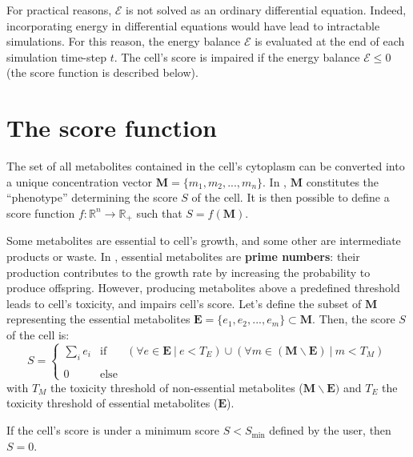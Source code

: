 For practical reasons, $\mathcal{E}$ is not solved as an ordinary differential equation. Indeed, incorporating energy in differential equations would have lead to intractable simulations. For this reason, the energy balance $\mathcal{E}$ is evaluated at the end of each simulation time-step $t$. The cell's score is impaired if the energy balance $\mathcal{E} \leq 0$ (the score function is described below).


\section{The score function}
\label{sec:part2:methodology:score_function}

The set of all metabolites contained in the cell's cytoplasm can be converted into a unique concentration vector $\boldsymbol{M} = \{m_1, m_2, ..., m_n\}$. In {\EvoEvoSim}, $\boldsymbol{M}$ constitutes the ``phenotype'' determining the score $S$ of the cell. It is then possible to define a score function $f : \mathbb{R}^n \rightarrow \mathbb{R}_+$ such that $S = f(\boldsymbol{M})$.

Some metabolites are essential to cell's growth, and some other are intermediate products or waste. In {\EvoEvoSim}, essential metabolites are \textbf{prime numbers}: their production contributes to the growth rate by increasing the probability to produce offspring. However, producing metabolites above a predefined threshold leads to cell's toxicity, and impairs cell's score. Let's define the subset of $\boldsymbol{M}$ representing the essential metabolites $\boldsymbol{E} = \{e_1, e_2, ..., e_m\} \subset \boldsymbol{M}$. Then, the score $S$ of the cell is:
\begin{equation}
S = 
\left\{
\begin{array}{lcr}
\sum_i e_i & \mbox{if} & (\forall e \in \boldsymbol{E}\  |\ e < T_E) \cup  (\forall m \in (\boldsymbol{M} \backslash \boldsymbol{E})\  |\ m < T_M)\\\\
0 & \mbox{else} &
\end{array}
\right.
\end{equation}
with $T_M$ the toxicity threshold of non-essential metabolites ($\boldsymbol{M} \backslash \boldsymbol{E})$ and $T_E$ the toxicity threshold of essential metabolites ($\boldsymbol{E}$).

If the cell's score is under a minimum score $S < S_{\text{min}}$ defined by the user, then $S = 0$.

